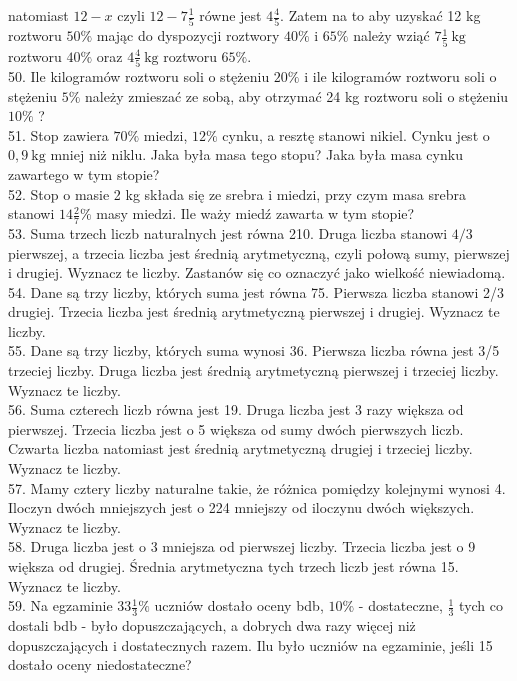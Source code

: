 \documentclass[10pt]{article}
\begin{document}
natomiast \(12-x\) czyli \(12-7 \frac{1}{5}\) równe jest \(4 \frac{4}{5}\). Zatem na to aby uzyskać 12 kg roztworu \(50 \%\) mając do dyspozycji roztwory \(40 \%\) i \(65 \%\) należy wziąć \(7 \frac{1}{5} \mathrm{~kg}\) roztworu \(40 \%\) oraz \(4 \frac{4}{5} \mathrm{~kg}\) roztworu \(65 \%\).\\
50. Ile kilogramów roztworu soli o stężeniu \(20 \%\) i ile kilogramów roztworu soli o stężeniu \(5 \%\) należy zmieszać ze sobą, aby otrzymać 24 kg roztworu soli o stężeniu \(10 \%\) ?\\
51. Stop zawiera \(70 \%\) miedzi, \(12 \%\) cynku, a resztę stanowi nikiel. Cynku jest o \(0,9 \mathrm{~kg}\) mniej niż niklu. Jaka była masa tego stopu? Jaka była masa cynku zawartego w tym stopie?\\
52. Stop o masie 2 kg składa się ze srebra i miedzi, przy czym masa srebra stanowi \(14 \frac{2}{7} \%\) masy miedzi. Ile waży miedź zawarta w tym stopie?\\
53. Suma trzech liczb naturalnych jest równa 210. Druga liczba stanowi \(4 / 3\) pierwszej, a trzecia liczba jest średnią arytmetyczną, czyli połową sumy, pierwszej i drugiej. Wyznacz te liczby. Zastanów się co oznaczyć jako wielkość niewiadomą.\\
54. Dane są trzy liczby, których suma jest równa 75. Pierwsza liczba stanowi 2/3 drugiej. Trzecia liczba jest średnią arytmetyczną pierwszej i drugiej. Wyznacz te liczby.\\
55. Dane są trzy liczby, których suma wynosi 36. Pierwsza liczba równa jest 3/5 trzeciej liczby. Druga liczba jest średnią arytmetyczną pierwszej i trzeciej liczby. Wyznacz te liczby.\\
56. Suma czterech liczb równa jest 19. Druga liczba jest 3 razy większa od pierwszej. Trzecia liczba jest o 5 większa od sumy dwóch pierwszych liczb. Czwarta liczba natomiast jest średnią arytmetyczną drugiej i trzeciej liczby. Wyznacz te liczby.\\
57. Mamy cztery liczby naturalne takie, że różnica pomiędzy kolejnymi wynosi 4. Iloczyn dwóch mniejszych jest o 224 mniejszy od iloczynu dwóch większych. Wyznacz te liczby.\\
58. Druga liczba jest o 3 mniejsza od pierwszej liczby. Trzecia liczba jest o 9 większa od drugiej. Średnia arytmetyczna tych trzech liczb jest równa 15. Wyznacz te liczby.\\
59. Na egzaminie \(33 \frac{1}{3} \%\) uczniów dostało oceny bdb, \(10 \%\) - dostateczne, \(\frac{1}{3}\) tych co dostali bdb - było dopuszczających, a dobrych dwa razy więcej niż dopuszczających i dostatecznych razem. Ilu było uczniów na egzaminie, jeśli 15 dostało oceny niedostateczne?\\
\end{document}
